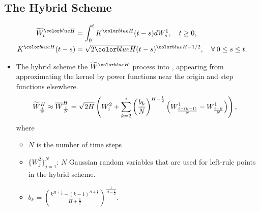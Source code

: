 \documentclass[ima, 20pt, portrait, plainboxedsections]{sciposter}
\begin{document}
\begin{multicols}{3}
\section*{The Hybrid Scheme \cite{bennedsen2017hybrid}}
\begin{align*}
	\widetilde{W}_t^{\blue{H}} &= \int_0^t K^{\blue{H}}(t-s) dW_s^1, \quad t \ge 0, \\ 	K^{\blue{H}}(t-s) &= \sqrt{2\blue{H}} (t-s)^{\blue{H} - 1/2},\quad \forall \: 0 \le s \le t. 
	\end{align*}
\begin{itemize}

\item 	The hybrid scheme  the  $\widetilde{W}^\blue{H}$ process into , appearing from approximating the kernel by power functions near the origin and step functions elsewhere.
\begin{align*}
\widetilde{W}^H_{\frac{i}{N}} \approx \overline{W}^H_{\frac{i}{N}}&= \sqrt{2H} \left(  W^2_i+\sum_{k=2}^{i} \left(\frac{b_k}{N}\right)^{H-\frac{1}{2}} \left(W_{\frac{i-(k-1)}{N}}^1-W_{\frac{i-k}{N}}^1\right)\right),
\end{align*}
where \begin{itemize}
\item $N$ is the number of time steps 
\item $\{W^{2}_j\}_{j=1}^N$:  $N$ Gaussian random variables that are used for left-rule points in the hybrid scheme.
\item $b_k=\left(\frac{k^{H+\frac{1}{2}}-(k-1)^{H+\frac{1}{2} }}{H+\frac{1}{2}}\right)^{\frac{1}{H-\frac{1}{2}}}.$
\end{itemize}
\end{itemize}

\end{multicols}
\end{document}

